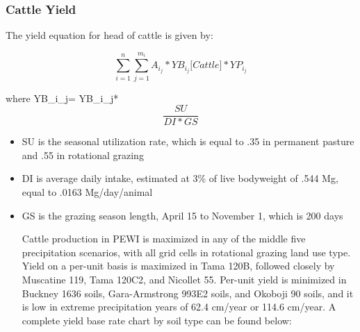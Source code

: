 \documentclass[11pt]{article}
\begin{document}
\subsubsection{Cattle Yield}
The yield equation for head of cattle is given by:

$$\sum_{i=1}^{n} \sum_{j=1}^{m_i} A_i_j *YB_i_j\bigg[Cattle\bigg]*YP_i_j$$

where YB_i_j = YB_i_j * \[\frac{SU}{DI * GS}\]

\begin{itemize}
\item SU is the seasonal utilization rate, which is equal to .35 in permanent pasture and .55 in rotational grazing
\item DI is average daily intake, estimated at 3\% of live bodyweight of .544 Mg, equal to .0163 Mg/day/animal
\item GS is the grazing season length, April 15 to November 1, which is 200 days

Cattle production in PEWI is maximized in any of the middle five precipitation scenarios, with all grid cells in rotational grazing land use type. Yield on a per-unit basis is maximized in Tama 120B, followed closely by Muscatine 119, Tama 120C2, and Nicollet 55. Per-unit yield is minimized in Buckney 1636 soils, Gara-Armstrong 993E2 soils, and Okoboji 90 soils, and it is low in extreme precipitation years of 62.4 cm/year or 114.6 cm/year. A complete yield base rate chart by soil type can be found below:


\end{itemize}
\end{document}
